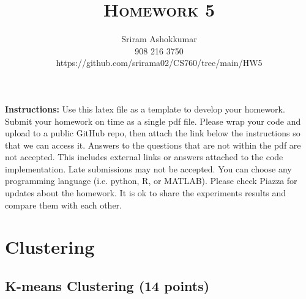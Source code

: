 \documentclass[a4paper]{article}
\title{\textsc{Homework 5}} %
\author{
  Sriram Ashokkumar\\
  908 216 3750\\
  https://github.com/srirama02/CS760/tree/main/HW5
}
\date{}
\theoremstyle{definition}
\begin{document}
\maketitle 


\textbf{Instructions:}
Use this latex file as a template to develop your homework. Submit your homework on time as a single pdf file. Please wrap your code and upload to a public GitHub repo, then attach the link below the instructions so that we can access it. Answers to the questions that are not within the pdf are not accepted. This includes external links or answers attached to the code implementation. Late submissions may not be accepted. You can choose any programming language (i.e. python, R, or MATLAB). Please check Piazza for updates about the homework. It is ok to share the experiments results and compare them with each other.

\vspace{0.1in}


\section{Clustering}

\subsection{K-means Clustering (14 points)}
\end{document}
